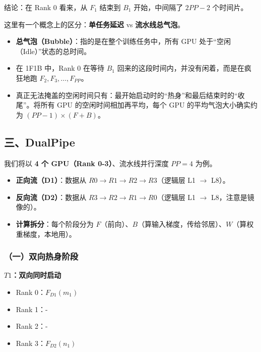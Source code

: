 结论：在 Rank 0 看来，从 \(F_1\) 结束到 \(B_1\) 开始，中间隔了 \(2PP - 2\) 个时间片。

这里有一个概念上的区分：\textbf{单任务延迟} vs \textbf{流水线总气泡}。

\begin{itemize}
\tightlist
\item
  \textbf{总气泡（Bubble）}：指的是在整个训练任务中，所有 GPU 处于``空闲（Idle）''状态的总时间。
\item
  在 1F1B 中，Rank 0 在等待 \(B_1\) 回来的这段时间内，并没有闲着，而是在疯狂地跑 \(F_2, F_3, \dots, F_{PP}\)。
\item
  真正无法掩盖的空闲时间只有：最开始启动时的``热身''和最后结束时的``收尾''。将所有 GPU 的空闲时间相加再平均，每个 GPU 的平均气泡大小确实约为 \((PP - 1) \times (F + B)\)。
\end{itemize}

\hypertarget{ux4e09dualpipe}{%
\subsection{三、DualPipe}\label{ux4e09dualpipe}}

我们将以 \textbf{4 个 GPU（Rank 0-3）}、流水线并行深度 \(PP = 4\) 为例。

\begin{itemize}
\tightlist
\item
  \textbf{正向流（D1）}：数据从 \(R0 \to R1 \to R2 \to R3\)（逻辑层 L1 \(\to\) L8）。
\item
  \textbf{反向流（D2）}：数据从 \(R3 \to R2 \to R1 \to R0\)（逻辑层 L1 \(\to\) L8，注意是镜像的）。
\item
  \textbf{计算拆分}：每个阶段分为 \(F\)（前向）、\(B\)（算输入梯度，传给邻居）、\(W\)（算权重梯度，本地用）。
\end{itemize}

\hypertarget{ux4e00ux53ccux5411ux70edux8eabux9636ux6bb5}{%
\subsubsection{（一）双向热身阶段}\label{ux4e00ux53ccux5411ux70edux8eabux9636ux6bb5}}

\textbf{\(T1\)：双向同时启动}

\begin{itemize}
\tightlist
\item
  Rank 0：\(F_{D1}(m_1)\)
\item
  Rank 1：-
\item
  Rank 2：-
\item
  Rank 3：\(F_{D2}(n_1)\)
\end{itemize}

